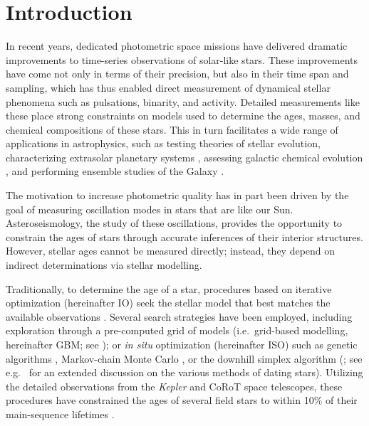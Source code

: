 \documentclass[manuscript,linenumbers]{aastex6}
\begin{document}


\section{Introduction}

In recent years, dedicated photometric space missions have delivered dramatic improvements to time-series observations of solar-like stars. These improvements have come not only in terms of their precision, but also in their time span and sampling, which has thus enabled direct measurement of dynamical stellar phenomena such as pulsations, binarity, and activity. Detailed measurements like these place strong constraints on models used to determine the ages, masses, and chemical compositions of these stars. This in turn facilitates a wide range of applications in astrophysics, such as testing theories of stellar evolution, characterizing extrasolar planetary systems \citep[e.g.][]{2015ApJ...799..170C, 2015MNRAS.452.2127S}, assessing galactic chemical evolution \citep[e.g.][]{2015ASSP...39..111C}, and performing ensemble studies of the Galaxy \citep[e.g.][]{2011Sci...332..213C, 2013MNRAS.429..423M, 2014ApJS..210....1C}. 

The motivation to increase photometric quality has in part been driven by the goal of measuring oscillation modes in stars that are like our Sun. Asteroseismology, the study of these oscillations, provides the opportunity to constrain the ages of stars through accurate inferences of their interior structures. However, stellar ages cannot be measured directly; instead, they depend on indirect determinations via stellar modelling. 

Traditionally, to determine the age of a star, procedures based on iterative optimization (hereinafter IO) seek the stellar model that best matches the available observations \citep{1994ApJ...427.1013B}. 
Several search strategies have been employed, including exploration through a pre-computed grid of models (i.e.\ grid-based modelling, hereinafter GBM; see \citealt{2011ApJ...730...63G, 2014ApJS..210....1C}); or \emph{in situ} optimization (hereinafter ISO) such as genetic algorithms \citep{2014ApJS..214...27M}, Markov-chain Monte Carlo \citep{2012MNRAS.427.1847B}, or the downhill simplex algorithm (\citealt{2013ApJS..208....4P}; see e.g.\ \citealt{2015MNRAS.452.2127S} for an extended discussion on the various methods of dating stars). Utilizing the detailed observations from the \emph{Kepler} and CoRoT space telescopes, these procedures have constrained the ages of several field stars to within 10\% of their main-sequence lifetimes \citep{2015MNRAS.452.2127S}. 
\end{document}
